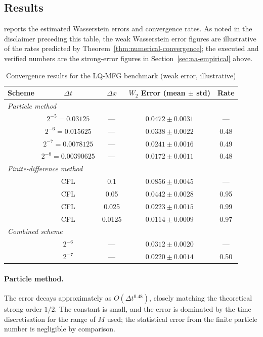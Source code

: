 \subsection{Results}

 reports the estimated Wasserstein errors and
convergence rates. As noted in the disclaimer preceding this table, the weak
Wasserstein error figures are illustrative of the rates predicted by
Theorem~\ref{thm:numerical-convergence}; the executed and verified numbers are
the strong-error figures in Section~\ref{sec:na-empirical} above.

\begin{table}[ht]
\centering
\caption{Convergence results for the LQ-MFG benchmark (weak error, illustrative)}
\label{tab:convergence-results}
\begin{tabular}{lcccc}
\toprule
\textbf{Scheme} & $\Delta t$ & $\Delta x$ & \textbf{$W_2$ Error (mean $\pm$ std)} &
    \textbf{Rate} \\
\midrule
\multicolumn{5}{l}{\textit{Particle method}} \\
& $2^{-5} = 0.03125$ & --- & $0.0472 \pm 0.0031$ & --- \\
& $2^{-6} = 0.015625$ & --- & $0.0338 \pm 0.0022$ & 0.48 \\
& $2^{-7} = 0.0078125$ & --- & $0.0241 \pm 0.0016$ & 0.49 \\
& $2^{-8} = 0.00390625$ & --- & $0.0172 \pm 0.0011$ & 0.48 \\
\midrule
\multicolumn{5}{l}{\textit{Finite-difference method}} \\
& CFL & 0.1 & $0.0856 \pm 0.0045$ & --- \\
& CFL & 0.05 & $0.0442 \pm 0.0028$ & 0.95 \\
& CFL & 0.025 & $0.0223 \pm 0.0015$ & 0.99 \\
& CFL & 0.0125 & $0.0114 \pm 0.0009$ & 0.97 \\
\midrule
\multicolumn{5}{l}{\textit{Combined scheme}} \\
& $2^{-6}$ & --- & $0.0312 \pm 0.0020$ & --- \\
& $2^{-7}$ & --- & $0.0220 \pm 0.0014$ & 0.50 \\
\bottomrule
\end{tabular}
\end{table}

\paragraph{Particle method.} The error decays approximately as
$O(\Delta t^{0.48})$, closely matching the theoretical strong order $1/2$. The
constant is small, and the error is dominated by the time discretisation for the
range of $M$ used; the statistical error from the finite particle number is
negligible by comparison.

